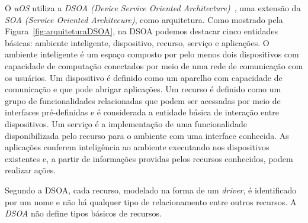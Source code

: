 O \emph{uOS} utiliza a \emph{DSOA (Device Service Oriented Architecture)}~\cite{buzetoDSOA2010}, uma extensão da \emph{SOA (Service Oriented Architecure)}, como arquitetura. Como mostrado pela Figura~\ref{fig:arquiteturaDSOA}, na DSOA podemos destacar cinco entidades básicas: ambiente inteligente, dispositivo, recurso, serviço e aplicações. O ambiente inteligente é um espaço composto por pelo menos dois dispositivos com capacidade de computação conectados por meio de uma rede de comunicação com os usuários. Um dispositivo é definido como um aparelho com capacidade de comunicação e que pode abrigar aplicações. Um recurso é definido como um grupo de funcionalidades relacionadas que podem ser acessadas por meio de interfaces pré-definidas e é considerada a entidade básica de interação entre dispositivos. Um serviço é a implementação de uma funcionalidade disponibilizada pelo recurso para o ambiente com uma interface conhecida. As aplicações conferem inteligência ao ambiente executando nos dispositivos existentes e, a partir de informações providas pelos recursos conhecidos, podem realizar ações. 

Segundo a DSOA, cada recurso, modelado na forma de um \emph{driver}, é identificado por um nome e não há qualquer tipo de relacionamento entre outros recursos. A \emph{DSOA} não define tipos básicos de recursos.	